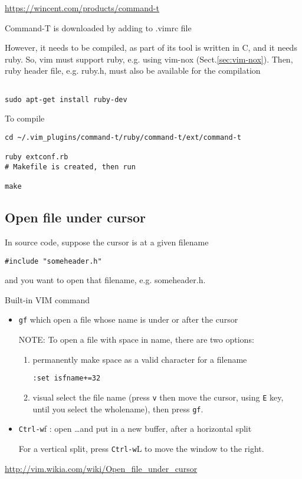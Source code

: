 \url{https://wincent.com/products/command-t}

Command-T is downloaded by adding to .vimrc file

However, it needs to be compiled, as part of its tool is written in C, and it
needs ruby.
So, vim must support ruby, e.g. using vim-nox (Sect.\ref{sec:vim-nox}). Then,
ruby header file, e.g. ruby.h, must also be available for the compilation
\begin{verbatim}

sudo apt-get install ruby-dev
\end{verbatim}

To compile
\begin{verbatim}
cd ~/.vim_plugins/command-t/ruby/command-t/ext/command-t

ruby extconf.rb
# Makefile is created, then run

make
\end{verbatim}



\subsection{Open file under cursor}
\label{sec:vim-open-file-under-cursor}

In source code, suppose the cursor is at a given filename
\begin{verbatim}
#include "someheader.h"
\end{verbatim}
and you want to open that filename, e.g. someheader.h.

Built-in VIM command 
\begin{itemize}
  \item \verb!gf! which open a file whose name is under or after
the cursor

NOTE: To open a file with space in name, there are two options:
\begin{enumerate}
  \item permanently make space as a valid character for a filename
\begin{verbatim}
:set isfname+=32
\end{verbatim}

   \item visual select the
file name (press \verb!v! then move the cursor, using \verb!E! key, until you select the
wholename), then press \verb!gf!.
   
\end{enumerate}


  \item \verb!Ctrl-w!f : open \ldots and put in a new buffer, after a horizontal
  split
  
  For a vertical split, press \verb!Ctrl-w!L to move the window to the right.
  
\end{itemize}
\url{http://vim.wikia.com/wiki/Open_file_under_cursor}

